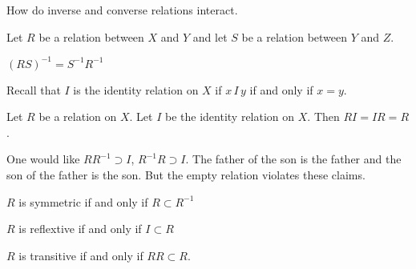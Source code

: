 

How do inverse and converse relations interact.


Let $R$ be a relation between $X$ and $Y$ and let $S$ be a relation between $Y$ and $Z$.

\begin{proposition}
  $(RS)^{-1} = S^{-1}R^{-1}$
\end{proposition}


Recall that $I$ is the identity relation on $X$ if $x\,I\,y$ if and only if $x = y$.

\begin{proposition}
  Let $R$ be a relation on $X$.
  Let $I$ be the identity relation on $X$.
  Then $RI = IR = R$.
\end{proposition}

One would like $RR^{-1} \supset I$, $R^{-1}R \supset I$.
The father of the son is the father and the son of the father is the son.
But the empty relation violates these claims.


\begin{proposition}
  $R$ is symmetric if and only if $R \subset R^{-1}$
\end{proposition}

\begin{proposition}
  $R$ is reflextive if and only if $I \subset R$
\end{proposition}

\begin{proposition}
  $R$ is transitive if and only if $RR \subset R$.
\end{proposition}

\blankpage
